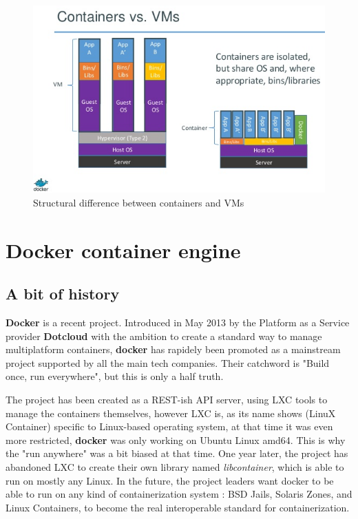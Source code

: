 \begin{figure}
	\includegraphics[width=\textwidth]{./Images/containers_vs_vms.png}
	\caption{Structural difference between containers and VMs}
\end{figure}

\section{Docker container engine}

\subsection{A bit of history}

\textbf{Docker} is a recent project. Introduced in May 2013 by the Platform as
a Service provider \textbf{Dotcloud} with the ambition to create a standard way
to manage multiplatform containers, \textbf{docker} has rapidely been promoted
as a mainstream project supported by all the main tech companies.  Their
catchword is "Build once, run everywhere", but this is only a half truth.

The project has been created as a REST-ish API server, using LXC tools to
manage the containers themselves, however LXC is, as its name shows (LinuX
Container) specific to Linux-based operating system, at that time it was even
more restricted, \textbf{docker} was only working on Ubuntu Linux amd64. This
is why the "run anywhere" was a bit biased at that time. One year later, the
project has abandoned LXC to create their own library named
\textit{libcontainer}, which is able to run on mostly any Linux. In the future,
the project leaders want docker to be able to run on any kind of
containerization system : BSD Jails, Solaris Zones, and Linux Containers, to
become the real interoperable standard for containerization.

